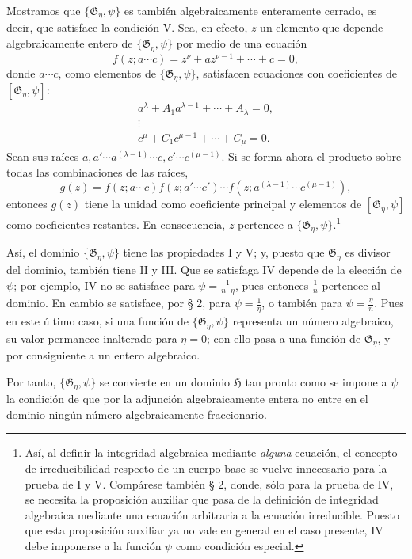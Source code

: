 \documentclass[11pt]{article}
\begin{document}
Mostramos que $\{\mathfrak G_\eta,\psi\}$ es también algebraicamente enteramente cerrado, es decir, que satisface la condición V. Sea, en efecto, $z$ un elemento que depende algebraicamente entero de $\{\mathfrak G_\eta,\psi\}$ por medio de una ecuación
\[
 f(z;a\cdots c)=z^\nu+a z^{\nu-1}+\cdots+c=0,
\]
donde $a\cdots c$, como elementos de $\{\mathfrak G_\eta,\psi\}$, satisfacen ecuaciones con coeficientes de $[\mathfrak G_\eta,\psi]$:
\[
\begin{gathered}
 a^\lambda+A_1a^{\lambda-1}+\cdots+A_\lambda=0,\\
 \vdots\\
 c^\mu+C_1c^{\mu-1}+\cdots+C_\mu=0.
\end{gathered}
\]
Sean sus raíces
$a,a'\cdots a^{(\lambda-1)}\cdots c,c'\cdots c^{(\mu-1)}$. Si se forma ahora el producto sobre todas las combinaciones de las raíces,
\[
 g(z)=f(z;a\cdots c)f(z;a'\cdots c')\cdots
      f(z;a^{(\lambda-1)}\cdots c^{(\mu-1)}),
\]
entonces $g(z)$ tiene la unidad como coeficiente principal y elementos de $[\mathfrak G_\eta,\psi]$ como coeficientes restantes. En consecuencia, $z$ pertenece a $\{\mathfrak G_\eta,\psi\}$.\footnote{Así, al definir la integridad algebraica mediante \emph{alguna} ecuación, el concepto de irreducibilidad respecto de un cuerpo base se vuelve innecesario para la prueba de I y V. Compárese también § 2, donde, sólo para la prueba de IV, se necesita la proposición auxiliar que pasa de la definición de integridad algebraica mediante una ecuación arbitraria a la ecuación irreducible. Puesto que esta proposición auxiliar ya no vale en general en el caso presente, IV debe imponerse a la función $\psi$ como condición especial.}

Así, el dominio $\{\mathfrak G_\eta,\psi\}$ tiene las propiedades I y V; y, puesto que $\mathfrak G_\eta$ es divisor del dominio, también tiene II y III. Que se satisfaga IV depende de la elección de $\psi$; por ejemplo, IV no se satisface para $\psi=\frac{1}{n\cdot\eta}$, pues entonces $\frac1n$ pertenece al dominio. En cambio se satisface, por § 2, para $\psi=\frac1\eta$, o también para $\psi=\frac{\eta}{n}$. Pues en este último caso, si una función de $\{\mathfrak G_\eta,\psi\}$ representa un número algebraico, su valor permanece inalterado para $\eta=0$; con ello pasa a una función de $\mathfrak G_\eta$, y por consiguiente a un entero algebraico.

Por tanto, $\{\mathfrak G_\eta,\psi\}$ se convierte en un dominio $\mathfrak H$ tan pronto como se impone a $\psi$ la condición de que por la adjunción algebraicamente entera no entre en el dominio ningún número algebraicamente fraccionario.
\end{document}
